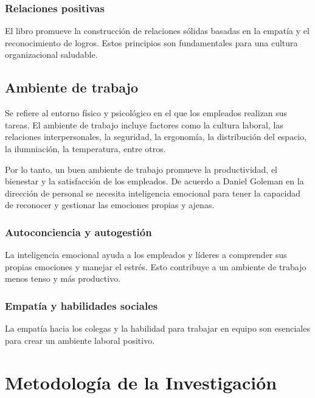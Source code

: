 \documentclass[journal]{IEEEtran}
\begin{document}
\subsubsection{Relaciones positivas}
El libro promueve la construcción de relaciones sólidas basadas en la empatía y el reconocimiento de logros. Estos principios son fundamentales para una cultura organizacional saludable.

\subsection{Ambiente de trabajo}
Se refiere al entorno físico y psicológico en el que los empleados realizan sus tareas. El ambiente de trabajo incluye factores como la cultura laboral, las relaciones interpersonales, la seguridad, la ergonomía, la distribución del espacio, la ilumniación, la temperatura, entre otros.

Por lo tanto, un buen ambiente de trabajo promueve la productividad, el bienestar y la satisfacción de los empleados. De acuerdo a Daniel Goleman en la dirección de personal se necesita inteligencia emocional para tener la capacidad de reconocer y gestionar las emociones propias y ajenas.

\subsubsection{Autoconciencia y autogestión}
La inteligencia emocional ayuda a los empleados y líderes a comprender sus propias emociones y manejar el estrés. Esto contribuye a un ambiente de trabajo menos tenso y más productivo.

\subsubsection{Empatía y habilidades sociales}
La empatía hacia los colegas y la habilidad para trabajar en equipo son esenciales para crear un ambiente laboral positivo.

\newpage

\section{Metodología de la Investigación}
\end{document}
